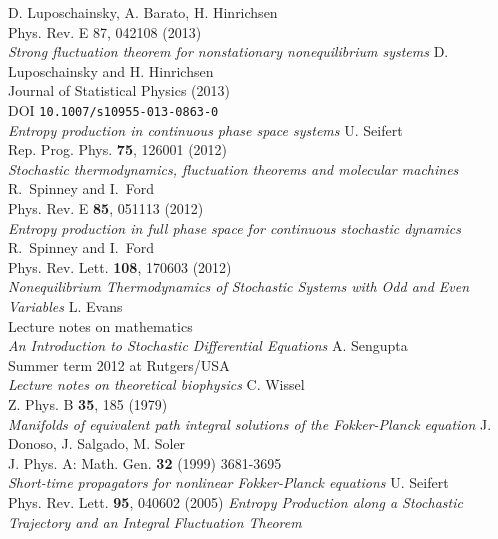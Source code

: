 \begin{thebibliography}{99}
	 {
		D. Luposchainsky, A. Barato, H. Hinrichsen \\
		Phys. Rev. E 87, 042108 (2013) \\
		\emph{Strong fluctuation theorem for nonstationary nonequilibrium systems}
		}
	 {
		D. Luposchainsky and H. Hinrichsen \\
		Journal of Statistical Physics (2013) \\
		DOI \texttt{10.1007/s10955-013-0863-0} \\
		\emph{Entropy production in continuous phase space systems}
		}
	 {
		U. Seifert \\
		Rep. Prog. Phys. \textbf{75}, 126001 (2012) \\
		\emph{Stochastic thermodynamics, fluctuation theorems and molecular machines}
		}
	 {
		R.~Spinney and I.~Ford \\
		Phys. Rev. E \textbf{85}, 051113 (2012) \\
		\emph{Entropy production in full phase space for continuous stochastic dynamics}
		}
	 {
		R.~Spinney and I.~Ford \\
		Phys. Rev. Lett. \textbf{108}, 170603 (2012) \\
		\emph{Nonequilibrium Thermodynamics of Stochastic Systems with Odd and Even Variables}
		}
	 {
		L. Evans \\
		Lecture notes on mathematics \\
		\emph{An Introduction to Stochastic Differential Equations}
		}
	 {
		A. Sengupta \\
		Summer term 2012 at Rutgers/USA \\
		\emph{Lecture notes on theoretical biophysics}
		}
	 {
		C. Wissel \\
		Z. Phys. B \textbf{35}, 185 (1979) \\
		\emph{Manifolds of equivalent path integral solutions of the Fokker-Planck equation}
		}
	 {
		J. Donoso, J. Salgado, M. Soler \\
		J. Phys. A: Math. Gen. \textbf{32} (1999) 3681-3695 \\
		\emph{Short-time propagators for nonlinear Fokker-Planck equations}
		}
	 {
		U. Seifert \\
		Phys. Rev. Lett. \textbf{95}, 040602 (2005)
		\emph{Entropy Production along a Stochastic Trajectory and an Integral Fluctuation Theorem}
	}
\end{thebibliography}

